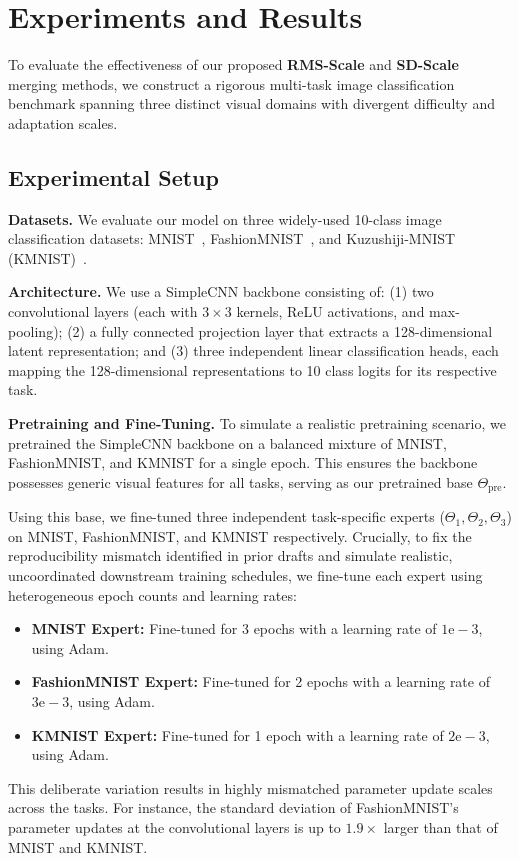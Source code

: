 \section{Experiments and Results}
\label{submission:sec:experiments}

To evaluate the effectiveness of our proposed \textbf{RMS-Scale} and \textbf{SD-Scale} merging methods, we construct a rigorous multi-task image classification benchmark spanning three distinct visual domains with divergent difficulty and adaptation scales. 

\subsection{Experimental Setup}

\textbf{Datasets.} We evaluate our model on three widely-used 10-class image classification datasets: MNIST~\cite{lecun1998gradient}, FashionMNIST~\cite{xiao2017fashion}, and Kuzushiji-MNIST (KMNIST)~\cite{clanuwat2018deep}.

\textbf{Architecture.} We use a SimpleCNN backbone consisting of: (1) two convolutional layers (each with $3 \times 3$ kernels, ReLU activations, and max-pooling); (2) a fully connected projection layer that extracts a 128-dimensional latent representation; and (3) three independent linear classification heads, each mapping the 128-dimensional representations to 10 class logits for its respective task.

\textbf{Pretraining and Fine-Tuning.} 
To simulate a realistic pretraining scenario, we pretrained the SimpleCNN backbone on a balanced mixture of MNIST, FashionMNIST, and KMNIST for a single epoch. This ensures the backbone possesses generic visual features for all tasks, serving as our pretrained base $\Theta_{\text{pre}}$.

Using this base, we fine-tuned three independent task-specific experts ($\Theta_1, \Theta_2, \Theta_3$) on MNIST, FashionMNIST, and KMNIST respectively. Crucially, to fix the reproducibility mismatch identified in prior drafts and simulate realistic, uncoordinated downstream training schedules, we fine-tune each expert using heterogeneous epoch counts and learning rates:
\begin{itemize}
    \item \textbf{MNIST Expert:} Fine-tuned for 3 epochs with a learning rate of $1\text{e}-3$, using Adam.
    \item \textbf{FashionMNIST Expert:} Fine-tuned for 2 epochs with a learning rate of $3\text{e}-3$, using Adam.
    \item \textbf{KMNIST Expert:} Fine-tuned for 1 epoch with a learning rate of $2\text{e}-3$, using Adam.
\end{itemize}
This deliberate variation results in highly mismatched parameter update scales across the tasks. For instance, the standard deviation of FashionMNIST's parameter updates at the convolutional layers is up to $1.9\times$ larger than that of MNIST and KMNIST.

